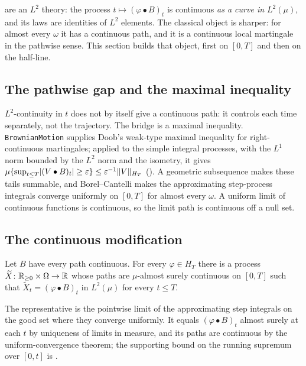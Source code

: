 \documentclass[11pt]{article}
\newcommand{\HT}{H_T}
\newcommand{\bulletB}{\mathbin{\bullet}}
\begin{document}
 are an $L^2$ theory: the process $t\mapsto(\varphi\bulletB B)_t$ is continuous
\emph{as a curve in $L^2(\mu)$}, and its laws are identities of $L^2$ elements. The classical object is
sharper: for almost every $\omega$ it has a continuous path, and it is a continuous local martingale in the
pathwise sense. This section builds that object, first on $[0,T]$ and then on the half-line.

\subsection{The pathwise gap and the maximal inequality}
$L^2$-continuity in $t$ does not by itself give a continuous path: it controls each time separately, not the
trajectory. The bridge is a maximal inequality. \texttt{BrownianMotion} supplies Doob's weak-type maximal
inequality for right-continuous martingales; applied to the simple integral processes, with the $L^1$ norm
bounded by the $L^2$ norm and the isometry, it gives
$\mu\{\sup_{t\le T}\abs{(V\bulletB B)_t}\ge\varepsilon\}\le\varepsilon^{-1}\norm{V}_{\HT}$
(). A geometric subsequence makes these tails summable, and Borel--Cantelli
makes the approximating step-process integrals converge uniformly on $[0,T]$ for almost every $\omega$. A uniform limit of continuous functions is continuous, so the limit path is
continuous off a null set.

\subsection{The continuous modification}

\begin{theorem}
Let $B$ have every path continuous. For every $\varphi\in\HT$ there is a process $\widetilde X\colon\mathbb{R}_{\ge0}\times\Omega\to\mathbb{R}$ whose paths are $\mu$-almost surely continuous on
$[0,T]$ such that $\widetilde X_t=(\varphi\bulletB B)_t$ in $L^2(\mu)$ for every $t\le T$.
\end{theorem}

The representative  is the pointwise limit of the approximating step integrals on the
good set where they converge uniformly. It equals $(\varphi\bulletB B)_t$ almost surely at each $t$ by uniqueness of
limits in measure, and its paths are continuous by the uniform-convergence theorem; the supporting bound on the
running supremum over $[0,t]$ is .
\end{document}
